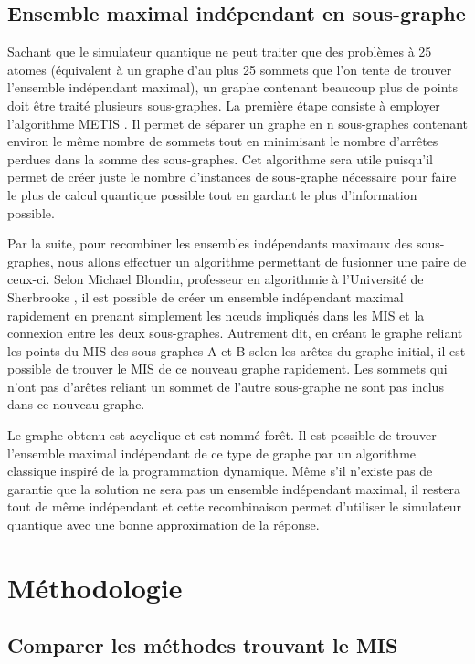 \documentclass[11pt]{article}
\begin{document}
\subsection{Ensemble maximal indépendant en sous-graphe}
Sachant que le simulateur quantique ne peut traiter que des problèmes à 25 atomes (équivalent à un graphe d'au plus 25 sommets que l'on tente de trouver l'ensemble indépendant maximal), un graphe contenant beaucoup plus de points doit être traité plusieurs sous-graphes. La première étape consiste à employer l'algorithme METIS \cite{karypis_multilevelk-way_1998}. Il permet de séparer un graphe en n sous-graphes contenant environ le même nombre de sommets tout en minimisant le nombre d'arrêtes perdues dans la somme des sous-graphes. Cet algorithme sera utile puisqu'il permet de créer juste le nombre d'instances de sous-graphe nécessaire pour faire le plus de calcul quantique possible tout en gardant le plus d'information possible. 

Par la suite, pour recombiner les ensembles indépendants maximaux des sous-graphes, nous allons effectuer un algorithme permettant de fusionner une paire de ceux-ci. Selon Michael Blondin, professeur en algorithmie à l'Université de Sherbrooke \cite{blondin_entretien_2024}, il est possible de créer un ensemble indépendant maximal rapidement en prenant simplement les nœuds impliqués dans les MIS et la connexion entre les deux sous-graphes. Autrement dit, en créant le graphe reliant les points du MIS des sous-graphes A et B selon les arêtes du graphe initial, il est possible de trouver le MIS de ce nouveau graphe rapidement. Les sommets qui n'ont pas d'arêtes reliant un sommet de l'autre sous-graphe ne sont pas inclus dans ce nouveau graphe.

Le graphe obtenu est acyclique et est nommé forêt. Il est possible de trouver l'ensemble maximal indépendant de ce type de graphe par un algorithme classique inspiré de la programmation dynamique. Même s'il n'existe pas de garantie que la solution ne sera pas un ensemble indépendant maximal, il restera tout de même indépendant et cette recombinaison permet d'utiliser le simulateur quantique avec une bonne approximation de la réponse.

\section{Méthodologie}

\subsection{Comparer les méthodes trouvant le MIS}
\end{document}
